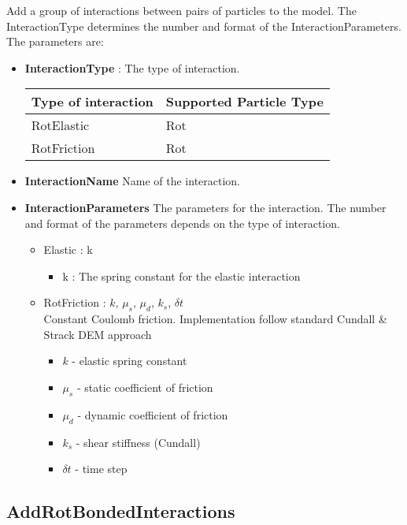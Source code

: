 \documentclass{report}
\begin{document}
Add a group of interactions between pairs of particles to the model.
The InteractionType determines the number and format of the InteractionParameters.
The parameters are:
\begin{itemize}
  \item \textbf{InteractionType} : The type of interaction. \par
  \begin{tabular}{|l|l|}
  \hline
  Type of interaction & Supported Particle Type \\
  \hline
  \hline
  RotElastic & Rot \\
  \hline
  RotFriction & Rot \\
  \hline
  \end{tabular} 

  \item \textbf{InteractionName} Name of the interaction.
  \item \textbf{InteractionParameters} The parameters for the interaction.
    The number and format of the parameters depends on the type of interaction.
    \begin{itemize}
      \item Elastic : k
      \begin{itemize}
        \item k : The spring constant for the elastic interaction
      \end{itemize}

      \item RotFriction : $k$, $\mu_s$, $\mu_d$, $k_s$, $\delta t$ \\
      Constant Coulomb friction. Implementation follow standard Cundall \& Strack DEM approach
      \begin{itemize}
        \item $k$ - elastic spring constant
        \item $\mu_s$ - static coefficient of friction
        \item $\mu_d$ - dynamic coefficient of friction
        \item $k_s$ - shear stiffness (Cundall)
        \item $\delta t$ - time step
      \end{itemize}
    \end{itemize}
\end{itemize}

\subsection{AddRotBondedInteractions}
\label{sec::AddRotBondedInteractions}
\end{document}
